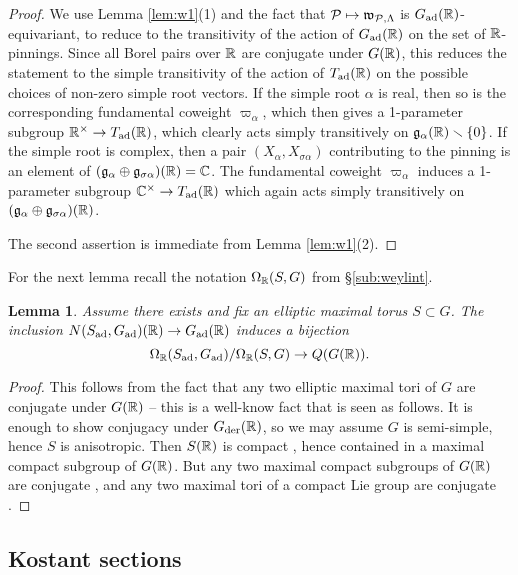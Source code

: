 \documentclass{article}
\newtheorem{lem}[thm]{Lemma}
\theoremstyle{definition}
\numberwithin{equation}{section}
\renewcommand{\-}{\hyp{}}
\newcommand{\w}{\mathfrak w}
\begin{document}
\begin{proof}
	  We use Lemma \ref{lem:w1}(1) and the fact that $\mc{P} \mapsto \w_{\mc{P},\Lambda}$ is $G_{\textrm{ad}}(\mathbb{R})$-equivariant, to reduce to the transitivity of the action of $G_{\textrm{ad}}(\mathbb{R})$ on the set of $\mathbb{R}$-pinnings. Since all Borel pairs over $\mathbb{R}$ are conjugate under $G(\mathbb{R})$, this reduces the statement to the simple transitivity of the action of $T_{\textrm{ad}}(\mathbb{R})$ on the possible choices of non-zero simple root vectors. If the simple root $\alpha$ is real, then so is the corresponding fundamental coweight $\varpi_\alpha$, which then gives a 1-parameter subgroup $\mathbb{R}^\times \to T_{\textrm{ad}}(\mathbb{R})$, which clearly acts simply transitively on $\mathfrak{g}_\alpha(\mathbb{R}) \smallsetminus \{0\}$. If the simple root is complex, then a pair $(X_\alpha,X_{\sigma\alpha})$ contributing to the pinning is an element of $(\mathfrak{g}_\alpha \oplus \mathfrak{g}_{\sigma\alpha})(\mathbb{R}) = \mathbb{C}$. The fundamental coweight $\varpi_\alpha$ induces a 1-parameter subgroup $\mathbb{C}^\times \to T_{\textrm{ad}}(\mathbb{R})$ which again acts simply transitively on $(\mathfrak{g}_\alpha \oplus \mathfrak{g}_{\sigma\alpha})(\mathbb{R})$.

The second assertion is immediate from Lemma \ref{lem:w1}(2).
\end{proof}

For the next lemma recall the notation $\Omega_{\mathbb{R}}(S,G)$ from \S\ref{sub:weylint}.

\begin{lem} \label{lem:g2}
	Assume there exists and fix an elliptic maximal torus $S \subset G$. The inclusion $N(S_{\textrm{ad}},G_{\textrm{ad}})(\mathbb{R}) \to G_{\textrm{ad}}(\mathbb{R})$ induces a bijection 
	\[ \Omega_{\mathbb{R}}(S_{\textrm{ad}},G_{\textrm{ad}})/\Omega_{\mathbb{R}}(S,G) \to Q(G(\mathbb{R})). \]
\end{lem}
\begin{proof}
	This follows from the fact that any two elliptic maximal tori of $G$ are conjugate under $G(\mathbb{R})$ -- this is a well-know fact that is seen as follows. It is enough to show conjugacy under $G_{\textrm{der}}(\mathbb{R})$, so we may assume $G$ is semi-simple, hence $S$ is anisotropic. Then $S(\mathbb{R})$ is compact \cite[\S24.6(c)]{Bor91}, hence contained in a maximal compact subgroup of $G(\mathbb{R})$. But any two maximal compact subgroups of $G(\mathbb{R})$ are conjugate \cite[\S24.6(a)]{Bor91}, and any two maximal tori of a compact Lie group are conjugate \cite[Corollary 4.35]{KnappLie}.
\end{proof}

\subsection{Kostant sections}
\label{s:kostant}
\end{document}
